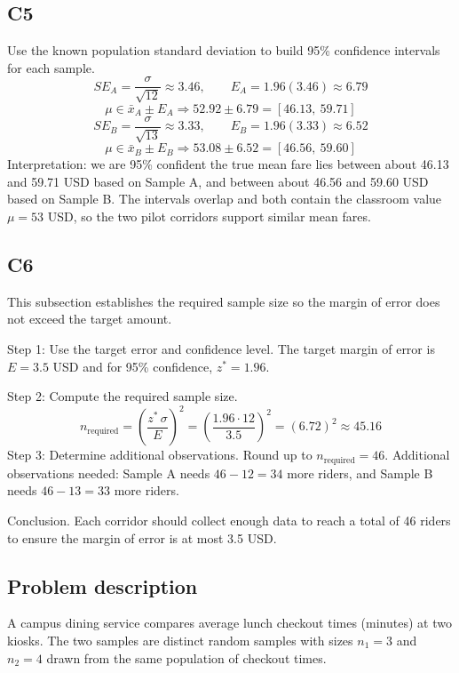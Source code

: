 \begin{ExamProblems}
		\subsection*{C5}
		Use the known population standard deviation to build 95\% confidence intervals for each sample.
		\[
		SE_A = \frac{\sigma}{\sqrt{12}} \approx 3.46, \qquad E_A = 1.96(3.46) \approx 6.79
		\]
		\[
		\mu \in \bar{x}_A \pm E_A \Rightarrow 52.92 \pm 6.79 = [46.13,\ 59.71]
		\]
		\[
		SE_B = \frac{\sigma}{\sqrt{13}} \approx 3.33, \qquad E_B = 1.96(3.33) \approx 6.52
		\]
		\[
		\mu \in \bar{x}_B \pm E_B \Rightarrow 53.08 \pm 6.52 = [46.56,\ 59.60]
		\]
		Interpretation: we are 95\% confident the true mean fare lies between about 46.13 and 59.71 USD based on Sample A, and between about 46.56 and 59.60 USD based on Sample B. The intervals overlap and both contain the classroom value $\mu = 53$ USD, so the two pilot corridors support similar mean fares.

		\subsection*{C6}
		This subsection establishes the required sample size so the margin of error does not exceed the target amount.

		Step 1: Use the target error and confidence level. The target margin of error is $E = 3.5$ USD and for 95\% confidence, $z^* = 1.96$.

		Step 2: Compute the required sample size.
		\[
		n_{\text{required}} = \left(\frac{z^*\,\sigma}{E}\right)^2
		= \left(\frac{1.96 \cdot 12}{3.5}\right)^2
		= \left(6.72\right)^2
		\approx 45.16
		\]
		Step 3: Determine additional observations. Round up to $n_{\text{required}} = 46$.
		Additional observations needed: Sample A needs $46 - 12 = 34$ more riders, and Sample B needs $46 - 13 = 33$ more riders.

		Conclusion. Each corridor should collect enough data to reach a total of 46 riders to ensure the margin of error is at most 3.5 USD.

		\newpage
		\item
		\subsection*{Problem description}
		A campus dining service compares average lunch checkout times (minutes) at two kiosks.
		The two samples are distinct random samples with sizes $n_1 = 3$ and $n_2 = 4$ drawn from the same population of checkout times.


\end{ExamProblems}
